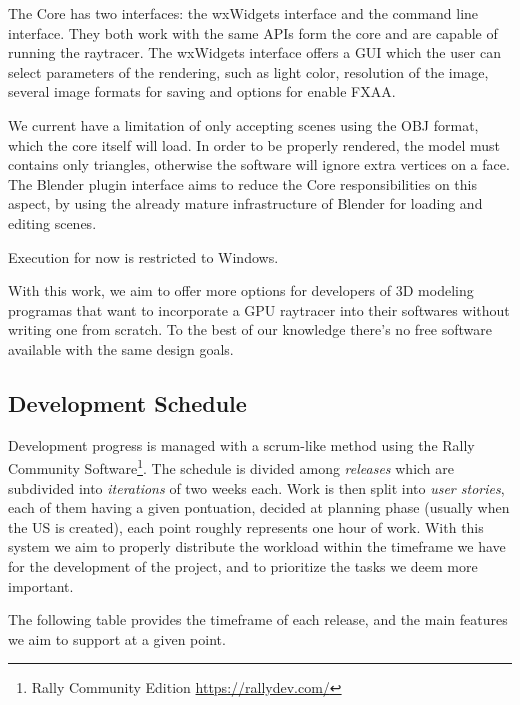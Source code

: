 \documentclass[a4paper]{sbgames}               %
\begin{document}
The Core has two interfaces: the wxWidgets interface and the command
line interface. They both work with the same APIs form the core and
are capable of running the raytracer. The wxWidgets interface offers a
GUI which the user can select parameters of the rendering, such as
light color, resolution of the image, several image formats for saving
and options for enable FXAA.

We current have a limitation of only accepting scenes using the OBJ
format, which the core itself will load. In order to be properly
rendered, the model must contains only triangles, otherwise the
software will ignore extra vertices on a face. The Blender plugin
interface aims to reduce the Core responsibilities on this aspect, by
using the already mature infrastructure of Blender for loading and
editing scenes.

Execution for now is restricted to Windows.

With this work, we aim to offer more options for developers of 3D
modeling programas that want to incorporate a GPU raytracer into their
softwares without writing one from scratch. To the best of our
knowledge there's no free software available with the same design
goals.

\subsection{Development Schedule}

Development progress is managed with a scrum-like method using the
Rally Community Software\footnote{Rally Community Edition
 \url{https://rallydev.com/}}. The schedule is divided among
\emph{releases} which are subdivided into \emph{iterations} of two
weeks each. Work is then split into \emph{user stories}, each of them
having a given pontuation, decided at planning phase (usually when the
US is created), each point roughly represents one hour of work. With
this system we aim to properly distribute the workload within the
timeframe we have for the development of the project, and to
prioritize the tasks we deem more important.

The following table provides the timeframe of each release, and the
main features we aim to support at a given point.
\end{document}
